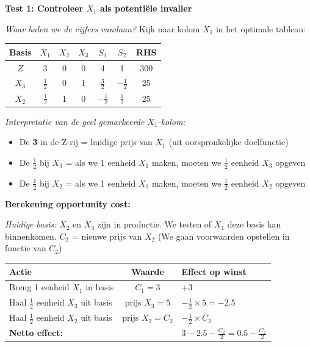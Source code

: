 \documentclass[a4paper,11pt]{article}
\begin{document}
\begin{oefenblok}[title=Productie Optimalisatie bij een Bedrijf]
\vspace{0.4cm}

\textbf{Test 1: Controleer $X_1$ als potentiële invaller}

\textit{Waar halen we de cijfers vandaan?} Kijk naar kolom $X_1$ in het optimale tableau:

\begin{center}
\begin{tabular}{c|ccccc|c}
\hline
Basis & $X_1$ & $X_2$ & $X_3$ & $S_1$ & $S_2$ & RHS \\
\hline
$Z$ & \cellcolor{yellow!30}3 & 0 & 0 & 4 & 1 & 300 \\
$X_3$ & \cellcolor{yellow!30}$\frac{1}{2}$ & 0 & 1 & $\frac{3}{2}$ & $-\frac{1}{2}$ & 25 \\
$X_2$ & \cellcolor{yellow!30}$\frac{1}{2}$ & 1 & 0 & $-\frac{1}{2}$ & $\frac{1}{2}$ & 25 \\
\hline
\end{tabular}
\end{center}

\textit{Interpretatie van de geel gemarkeerde $X_1$-kolom:}
\begin{itemize}
    \item De \textbf{3} in de Z-rij = huidige prijs van $X_1$ (uit oorspronkelijke doelfunctie)
    \item De \textbf{$\frac{1}{2}$} bij $X_3$ = als we 1 eenheid $X_1$ maken, moeten we $\frac{1}{2}$ eenheid $X_3$ opgeven
    \item De \textbf{$\frac{1}{2}$} bij $X_2$ = als we 1 eenheid $X_1$ maken, moeten we $\frac{1}{2}$ eenheid $X_2$ opgeven
\end{itemize}

\textbf{Berekening opportunity cost:}

\textit{Huidige basis:} $X_2$ en $X_3$ zijn in productie. We testen of $X_1$ deze basis kan binnenkomen.
$C_2$ = nieuwe prijs van $X_2$ (We gaan voorwaarden opstellen in functie van $C_2$)

\begin{center}
\begin{tabular}{l|c|l}
\hline
\textbf{Actie} & \textbf{Waarde} & \textbf{Effect op winst} \\
\hline
Breng 1 eenheid $X_1$ in basis & $C_1 = 3$ & $+3$ \\
Haal $\frac{1}{2}$ eenheid $X_3$ uit basis & prijs $X_3 = 5$ & $-\frac{1}{2} \times 5 = -2.5$ \\
Haal $\frac{1}{2}$ eenheid $X_2$ uit basis & prijs $X_2 = C_2$ & $-\frac{1}{2} \times C_2$ \\
\hline
\multicolumn{2}{l|}{\textbf{Netto effect:}} & $3 - 2.5 - \frac{C_2}{2} = 0.5 - \frac{C_2}{2}$ \\
\hline
\end{tabular}
\end{center}


\end{oefenblok}
\end{document}
